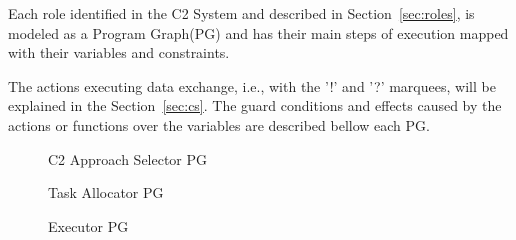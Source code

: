 Each role identified in the C2 System and described in Section~\ref{sec:roles}, is modeled as a Program Graph(PG) and has their main steps of execution mapped with their variables and constraints.

The actions executing data exchange, i.e., with the '!' and '?' marquees, will be explained in the Section~\ref{sec:cs}. The guard conditions and effects caused by the actions or functions over the variables are described bellow each PG.

\begin{figure}[h!]
\centering
\label{PG001}
\scalebox{.8}{}
\caption{C2 Approach Selector PG}
\end{figure}


\begin{figure}[h!]
\centering
\label{PG002}
\scalebox{.8}{}
\caption{Task Allocator PG}
\end{figure}


\begin{figure}[h!]
\centering
\label{PG003}
\scalebox{.8}{}
\caption{Executor PG}
\end{figure}